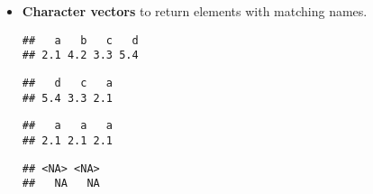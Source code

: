 \begin{itemize}
\item
  \textbf{Character vectors} to return elements with matching names.

\begin{Shaded}
\begin{Highlighting}[]
\StringTok{ }\NormalTok{(x, letters[}\OperatorTok{:}\NormalTok{]))}
\end{Highlighting}
\end{Shaded}

\begin{verbatim}
##   a   b   c   d 
## 2.1 4.2 3.3 5.4
\end{verbatim}

\begin{Shaded}
\begin{Highlighting}[]
\NormalTok{y[}\NormalTok{(}\NormalTok{, }\NormalTok{, }\NormalTok{)]}
\end{Highlighting}
\end{Shaded}

\begin{verbatim}
##   d   c   a 
## 5.4 3.3 2.1
\end{verbatim}

\begin{Shaded}
\begin{Highlighting}[]
\NormalTok{y[}\NormalTok{(}\NormalTok{, }\NormalTok{, }\NormalTok{)]}
\end{Highlighting}
\end{Shaded}

\begin{verbatim}
##   a   a   a 
## 2.1 2.1 2.1
\end{verbatim}

\begin{Shaded}
\begin{Highlighting}[]
\CommentTok{# When subsetting with [ names are always matched exactly}
\StringTok{ }\NormalTok{(} \NormalTok{, } \NormalTok{)}
\NormalTok{z[}\NormalTok{(}\NormalTok{, }\NormalTok{)]}
\end{Highlighting}
\end{Shaded}

\begin{verbatim}
## <NA> <NA> 
##   NA   NA
\end{verbatim}
\end{itemize}

